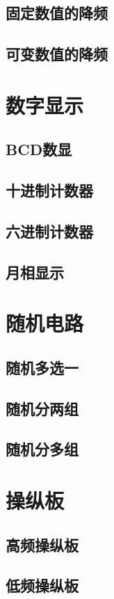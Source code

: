\subsection{固定数值的降频}
\subsection{可变数值的降频}

\section{数字显示}
\subsection{BCD数显}
\subsection{十进制计数器}
\subsection{六进制计数器}
\subsection{月相显示}

\section{随机电路}
\subsection{随机多选一}
\subsection{随机分两组}
\subsection{随机分多组}

\section{操纵板}
\subsection{高频操纵板}
\subsection{低频操纵板}

